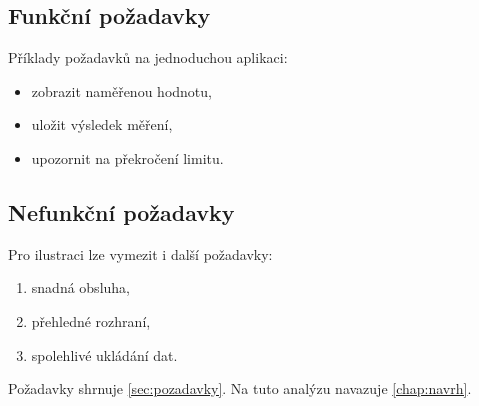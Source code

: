 \subsection{Funkční požadavky}
Příklady požadavků na jednoduchou aplikaci:
\begin{itemize}
  \item zobrazit naměřenou hodnotu,
  \item uložit výsledek měření,
  \item upozornit na překročení limitu.
\end{itemize}

\subsection{Nefunkční požadavky}
Pro ilustraci lze vymezit i další požadavky:
\begin{enumerate}
  \item snadná obsluha,
  \item přehledné rozhraní,
  \item spolehlivé ukládání dat.
\end{enumerate}

Požadavky shrnuje \autoref{sec:pozadavky}. Na tuto analýzu
navazuje \autoref{chap:navrh}.
